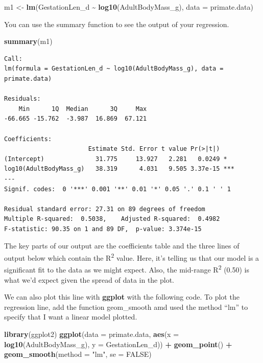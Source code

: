 \documentclass[
]{book}
\newenvironment{Shaded}{\begin{snugshade}}{\end{snugshade}}
\newcommand{\DataTypeTok}[1]{\textcolor[rgb]{0.13,0.29,0.53}{#1}}
\newcommand{\KeywordTok}[1]{\textcolor[rgb]{0.13,0.29,0.53}{\textbf{#1}}}
\newcommand{\NormalTok}[1]{#1}
\newcommand{\OperatorTok}[1]{\textcolor[rgb]{0.81,0.36,0.00}{\textbf{#1}}}
\newcommand{\OtherTok}[1]{\textcolor[rgb]{0.56,0.35,0.01}{#1}}
\newcommand{\StringTok}[1]{\textcolor[rgb]{0.31,0.60,0.02}{#1}}
\begin{document}
\begin{Shaded}
\begin{Highlighting}[]
\NormalTok{m1 \textless{}{-}}\StringTok{ }\KeywordTok{lm}\NormalTok{(GestationLen\_d }\OperatorTok{\textasciitilde{}}\StringTok{ }\KeywordTok{log10}\NormalTok{(AdultBodyMass\_g), }\DataTypeTok{data =}\NormalTok{ primate.data)}
\end{Highlighting}
\end{Shaded}

You can use the summary function to see the output of your regression.

\begin{Shaded}
\begin{Highlighting}[]
\KeywordTok{summary}\NormalTok{(m1)}
\end{Highlighting}
\end{Shaded}

\begin{verbatim}
Call:
lm(formula = GestationLen_d ~ log10(AdultBodyMass_g), data = primate.data)

Residuals:
    Min      1Q  Median      3Q     Max 
-66.665 -15.762  -3.987  16.869  67.121 

Coefficients:
                       Estimate Std. Error t value Pr(>|t|)    
(Intercept)              31.775     13.927   2.281   0.0249 *  
log10(AdultBodyMass_g)   38.319      4.031   9.505 3.37e-15 ***
---
Signif. codes:  0 '***' 0.001 '**' 0.01 '*' 0.05 '.' 0.1 ' ' 1

Residual standard error: 27.31 on 89 degrees of freedom
Multiple R-squared:  0.5038,    Adjusted R-squared:  0.4982 
F-statistic: 90.35 on 1 and 89 DF,  p-value: 3.374e-15
\end{verbatim}

The key parts of our output are the coefficients table and the three lines of output below which contain the R\textsuperscript{2} value. Here, it's telling us that our model is a significant fit to the data as we might expect. Also, the mid-range R\textsuperscript{2} (0.50) is what we'd expect given the spread of data in the plot.

We can also plot this line with \textbf{ggplot} with the following code. To plot the regression line, add the function geom\_smooth amd used the method ``lm'' to specify that I want a linear model plotted.

\begin{Shaded}
\begin{Highlighting}[]
\KeywordTok{library}\NormalTok{(ggplot2)}
\KeywordTok{ggplot}\NormalTok{(}\DataTypeTok{data =}\NormalTok{ primate.data, }\KeywordTok{aes}\NormalTok{(}\DataTypeTok{x =} \KeywordTok{log10}\NormalTok{(AdultBodyMass\_g), }\DataTypeTok{y =}\NormalTok{ GestationLen\_d)) }\OperatorTok{+}
\StringTok{  }\KeywordTok{geom\_point}\NormalTok{() }\OperatorTok{+}\StringTok{ }
\StringTok{  }\KeywordTok{geom\_smooth}\NormalTok{(}\DataTypeTok{method =} \StringTok{"lm"}\NormalTok{, }\DataTypeTok{se =} \OtherTok{FALSE}\NormalTok{)}
\end{Highlighting}
\end{Shaded}
\end{document}
